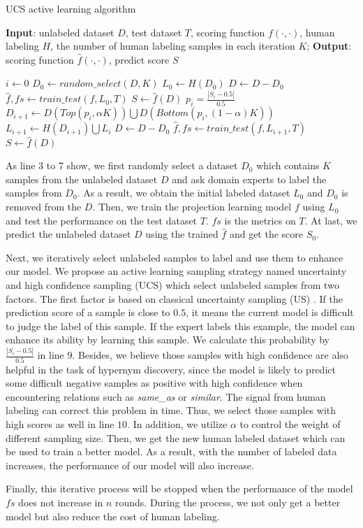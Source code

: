 \begin{algorithm}
	\small
	\caption{UCS active learning algorithm}
	\label{alg:al}
	\textbf{Input}: unlabeled dataset $D$, test dataset $T$, scoring function $f(\cdot,\cdot)$, human labeling $H$, 
	the number of human labeling samples in each iteration $K$;
	\textbf{Output}: scoring function $\hat f(\cdot,\cdot)$, predict score $S$ \ \ \ \ \ \ \ \ \ \  \ \
	\begin{algorithmic}[1]
		\State $i \gets 0$
		\State $D_0 \gets random\_select(D, K)$
		\State $L_0 \gets H(D_0)$
		\State $D \gets D - D_0$
		\State $\hat f, fs \gets train\_test(f, L_0, T)$
		\State $S \gets \hat f(D)$
		\Repeat
		\State $p_i = \frac{|S_i-0.5|}{0.5}$ 
		\State $D_{i+1} \gets D(Top(p_i, \alpha K)) \bigcup D(Bottom(p_i, (1-\alpha) K)) $ 
		\State $L_{i+1} \gets H(D_{i+1}) \bigcup L_i$
		\State $D \gets D - D_0$
		\State $\hat f, fs \gets train\_test(f, L_{i+1}, T)$
		\State $S \gets \hat f(D)$
		\EndProcedure
	\end{algorithmic}
\end{algorithm}

As line 3 to 7 show, 
we first randomly select a dataset $D_0$ which contains $K$ samples from the unlabeled dataset $D$ and ask domain experts to label the samples from $D_0$.
As a result, we obtain the initial labeled dataset $L_0$ and $D_0$ is removed from the $D$. 
Then, we train the projection learning model $f$ using $L_0$ and test the performance on the test dataset $T$. $fs$ is the metrics on $T$. 
At last, we predict the unlabeled dataset $D$ using the trained $\hat f$ and get the score $S_0$.

Next, we iteratively select unlabeled samples to label and use them to enhance our model. 
We propose an active learning sampling strategy named uncertainty and high confidence sampling (UCS) which select unlabeled samples from two factors.
The first factor is based on classical uncertainty sampling (US)  \cite{lewis1994heterogeneous}.
If the prediction score of a sample is close to $0.5$, it means the current model is difficult to judge the label of this sample. 
If the expert labels this example, the model can enhance its ability by learning this sample. 
We calculate this probability by $\frac{|S_i-0.5|}{0.5}$ in line $9$.
Besides, we believe those samples with high confidence are also helpful in the task of hypernym discovery, since the model is likely to predict some difficult negative samples as positive with high confidence when encountering relations such as \textit{same\_as} or \textit{similar}.
The signal from human labeling can correct this problem in time.
Thus, we select those samples with high scores as well in line $10$.
In addition, we utilize $\alpha$ to control the weight of different sampling size.
Then, we get the new human labeled dataset which can be used to train a better model. 
As a result, with the number of labeled data increases, 
the performance of our model will also increase. 

Finally, this iterative process will be stopped when the performance of the model $fs$ does not increase in $n$ rounds. 
During the process, we not only get a better model but also reduce the cost of human labeling.


